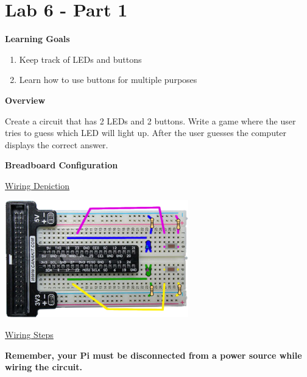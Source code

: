 \newpage

\section{Lab 6 - Part 1}

\textbf{Learning Goals}

\begin{enumerate}
	\item Keep track of LEDs and buttons
	\item Learn how to use buttons for multiple purposes
\end{enumerate}

\textbf{Overview}

Create a circuit that has 2 LEDs and 2 buttons. Write a game where the user tries to guess which LED will light up. After the user guesses the computer displays the correct answer.

\textbf{Breadboard Configuration}

\underline{Wiring Depiction}

\beforefig
\centerline{\includegraphics[height=2in]{pi_images/lab06images/PiLab06-GuessingGame.png}}
\afterfig

\underline{Wiring Steps}

\textbf{Remember, your Pi must be disconnected from a power source while wiring the circuit.}

